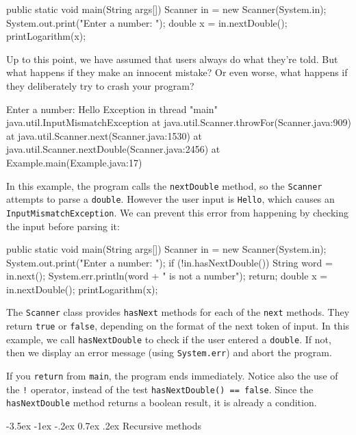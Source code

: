 \documentclass[12pt]{book}
\makeatletter
\renewcommand{\section}{\@startsection {section}{1}{\z@}%
    {-3.5ex \@plus -1ex \@minus -.2ex}%
    {0.7ex \@plus.2ex}%
    {\normalfont\Large\bfseries}}
\theoremstyle{exercise}
\newcommand{\java}[1]{\lstinline{#1}} %
\makeatother
\begin{document}
\begin{code}
    public static void main(String args[]) {
        Scanner in = new Scanner(System.in);
        System.out.print("Enter a number: ");
        double x = in.nextDouble();
        printLogarithm(x);
    }
\end{code}

Up to this point, we have assumed that users always do what they're told.
But what happens if they make an innocent mistake?
Or even worse, what happens if they deliberately try to crash your program?

\begin{stdout}
Enter a number: Hello
Exception in thread "main" java.util.InputMismatchException
	at java.util.Scanner.throwFor(Scanner.java:909)
	at java.util.Scanner.next(Scanner.java:1530)
	at java.util.Scanner.nextDouble(Scanner.java:2456)
	at Example.main(Example.java:17)
\end{stdout}

In this example, the program calls the \java{nextDouble} method, so the \java{Scanner} attempts to parse a \java{double}.
However the user input is \java{Hello}, which causes an \java{InputMismatchException}.
We can prevent this error from happening by checking the input before parsing it:

\begin{code}
    public static void main(String args[]) {
        Scanner in = new Scanner(System.in);
        System.out.print("Enter a number: ");
        if (!in.hasNextDouble()) {
            String word = in.next();
            System.err.println(word + " is not a number");
            return;
        }
        double x = in.nextDouble();
        printLogarithm(x);
    }
\end{code}

The \java{Scanner} class provides \java{hasNext} methods for each of the \java{next} methods.
They return \java{true} or \java{false}, depending on the format of the next token of input.
In this example, we call \java{hasNextDouble} to check if the user entered a \java{double}.
If not, then we display an error message (using \java{System.err}) and abort the program.

If you \java{return} from \java{main}, the program ends immediately.
Notice also the use of the \java{!} operator, instead of the test \java{hasNextDouble() == false}.
Since the \java{hasNextDouble} method returns a boolean result, it is already a condition.


\section{Recursive methods}
\label{recursion}
\end{document}
